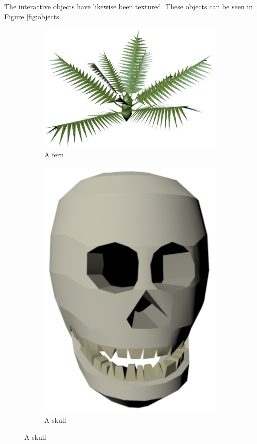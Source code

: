 The interactive objects have likewise been textured. These objects can be seen in Figure \ref{fig:objects}.

\begin{figure}[h!]
    \centering
    \begin{subfigure}[b]{0.3\textwidth}
    	\centering
        \includegraphics[scale=0.2]{figures/fern.png}\caption{A fern\label{fig:fern}}
    \end{subfigure}
    \begin{subfigure}[b]{0.3\textwidth}
    	\centering
        \includegraphics[scale=0.2]{figures/skull.png}\caption{A skull\label{fig:skull}}

\end{subfigure}
\end{figure}
